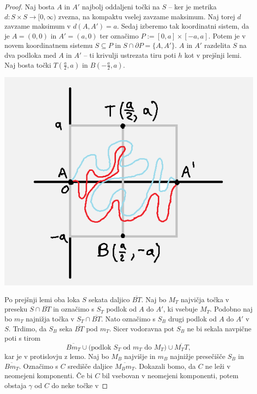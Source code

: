 \documentclass[10pt, a4paper]{article}
\newenvironment{noticeC}{%
  \tcolorbox[%
  notitle,
  empty,
  enhanced,  %
  breakable,
  coltext=black, 
  fontupper=\rmfamily,
  noparskip,
  sharp corners,
  boxrule=-1pt,  %
  frame hidden,
  left=7pt,  %
  right=7pt,
  top=5pt,
  bottom=5pt,
  before skip=2.5ex plus 2pt,
  after skip=2.5ex plus 2pt,
  overlay unbroken and last={%
  },
  ]}
{\endtcolorbox}
\newenvironment{dokaz}%
  {\begin{noticeC}\begin{proof}}%
  {\end{proof}\end{noticeC}}
\begin{document}
\begin{dokaz}
  Naj bosta $A$ in $A'$ najbolj oddaljeni točki na $S$ -- ker je metrika $d: S \times S \to [0, \infty)$
  zvezna, na kompaktu vselej zavzame maksimum. Naj torej $d$ zavzame maksimum v $d(A, A') = a$.
  Sedaj izberemo tak koordinatni sistem, da je $A = (0, 0)$ in $A' = (a, 0)$ ter označimo $P := [0, a] \times [-a, a]$.
  Potem je v novem koordinatnem sistemu $S \subseteq P$ in $S \cap \partial P = \{A, A'\}$.
  $A$ in $A'$ razdelita $S$ na dva podloka med $A$ in $A'$ -- ti krivulji ustrezata tiru poti $h$ kot v prejšnji lemi.
  Naj bosta točki $T\left(\frac{a}{2}, a\right)$ in $B\left(-\frac{a}{2}, a\right)$.
  \begin{center}
    \includegraphics[scale=0.8]{dokaz5.png}
  \end{center}
  Po prejšnji lemi oba loka $S$ sekata daljico $\overline{BT}$.
  Naj bo $M_T$ najvičja točka v preseku $S \cap \overline{BT}$ in označimo s $S_T$ podlok od $A$ do $A'$,
  ki vsebuje $M_T$. Podobno naj bo $m_T$ najnižja točka v $S_T \cap \overline{BT}$. Nato označimo 
  s $S_B$ drugi podlok od $A$ do $A'$ v $S$. Trdimo, da $S_B$ seka $\overline{BT}$ pod $m_T$.
  Sicer vodoravna pot $S_B$ ne bi sekala navpične poti s tirom 
  $$\overline{Bm_T} \cup \text{(podlok $S_T$ od $m_T$ do $M_T$)} \cup \overline{M_T T},$$
  kar je v protislovju z lemo. Naj bo $M_B$ najvišje in $m_B$ najnižje presečišče $S_B$ in $\overline{B m_T}$.
  Označimo s $C$ središče daljice $\overline{M_B m_T}$. Dokazali bomo, da $C$ ne leži v neomejeni komponenti.
  Če bi $C$ bil vsebovan v neomejeni komponenti, potem obstaja $\gamma$ od $C$ do neke točke v 

\end{dokaz}
\end{document}
